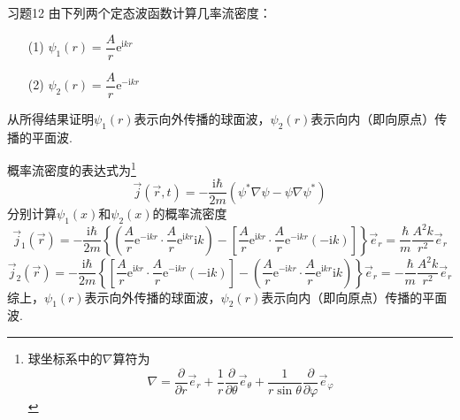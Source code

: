 \begin{question}{习题12}
    由下列两个定态波函数计算几率流密度：
    \begin{enumerate}
        \item[(1)] $\psi_1(r)=\dfrac{A}{r}\mathrm{e}^{\mathrm{i}kr}$
        \item[(2)] $\psi_2(r)=\dfrac{A}{r}\mathrm{e}^{-\mathrm{i}kr}$
    \end{enumerate}
    从所得结果证明$\psi_1(r)$表示向外传播的球面波，$\psi_2(r)$表示向内（即向原点）传播的平面波.
\end{question}
\begin{solution}
    概率流密度的表达式为\footnote{球坐标系中的$\nabla$算符为$$\nabla=\frac{\partial }{\partial r}\vec{e}_r + \frac{1}{r}\frac{\partial }{\partial \theta}\vec{e}_{\theta} + \frac{1}{r\sin\theta}\frac{\partial }{\partial \varphi}\vec{e}_{\varphi}$$}
    \begin{equation}\label{概率流密度}
        \vec{j}(\vec{r}, t) = -\frac{\mathrm{i}\hbar}{2m}\left(\psi^*\nabla\psi-\psi\nabla\psi^*\right)
    \end{equation}
    分别计算$\psi_1(x)$和$\psi_2(x)$的概率流密度
    $$
        \vec{j}_1(\vec{r}) = -\frac{\mathrm{i}\hbar}{2m}\left\{\left(\frac{A}{r}\mathrm{e}^{-\mathrm{i}kr}\cdot\frac{A}{r}\mathrm{e}^{\mathrm{i}kr}\mathrm{i}k\right) - \left[\frac{A}{r}\mathrm{e}^{\mathrm{i}kr}\cdot\frac{A}{r}\mathrm{e}^{-\mathrm{i}kr}(-\mathrm{i}k)\right]\right\}\vec{e}_r
        =\frac{\hbar}{m}\frac{A^2k}{r^2}\vec{e}_r
    $$
    $$
        \vec{j}_2(\vec{r}) = -\frac{\mathrm{i}\hbar}{2m}\left\{\left[\frac{A}{r}\mathrm{e}^{\mathrm{i}kr}\cdot\frac{A}{r}\mathrm{e}^{-\mathrm{i}kr}(-\mathrm{i}k)\right]-\left(\frac{A}{r}\mathrm{e}^{-\mathrm{i}kr}\cdot\frac{A}{r}\mathrm{e}^{\mathrm{i}kr}\mathrm{i}k\right)\right\}\vec{e}_r
        =-\frac{\hbar}{m}\frac{A^2k}{r^2}\vec{e}_r
    $$
    综上，$\psi_1(r)$表示向外传播的球面波，$\psi_2(r)$表示向内（即向原点）传播的平面波.
\end{solution}

